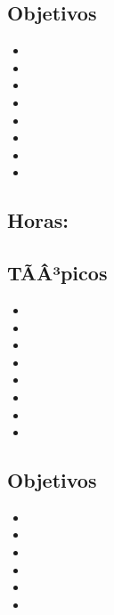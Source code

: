 \subsection*{Objetivos}
\begin{itemize}
	\item \ARTRESObjUNO
	\item \ARTRESObjDOS
	\item \ARTRESObjTRES
	\item \ARTRESObjCUATRO
	\item \ARTRESObjCINCO
	\item \ARTRESObjSEIS
	\item \ARTRESObjSIETE
	\item \ARTRESObjOCHO
\end{itemize}

\subsection{\ARCUATRODef}\label{sec:BOK-AR4}
\subsection*{Horas: \ARCUATROHours}

\subsection*{TÃÂ³picos}
\begin{itemize}
	\item \ARCUATROTopicSistemas
	\item \ARCUATROTopicCodificacion
	\item \ARCUATROTopicJerarquia
	\item \ARCUATROTopicOrganizacion
	\item \ARCUATROTopicLatencia
	\item \ARCUATROTopicMemorias
	\item \ARCUATROTopicMemoria
	\item \ARCUATROTopicManejo
\end{itemize}

\subsection*{Objetivos}
\begin{itemize}
	\item \ARCUATROObjUNO
	\item \ARCUATROObjDOS
	\item \ARCUATROObjTRES
	\item \ARCUATROObjCUATRO
	\item \ARCUATROObjCINCO
	\item \ARCUATROObjSEIS
\end{itemize}

